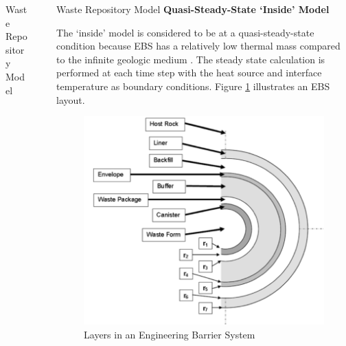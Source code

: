 \documentclass[final]{beamer}
\newlength{\sepwid}
\newlength{\onecolwid}
\newlength{\threecolwid}
\begin{document}
\begin{frame}[t]
\begin{columns}[t,totalwidth=\threecolwid]
\begin{column}{\onecolwid}
\begin{block}{Waste Repository Model}
\end{block}



\end{column} %

\begin{column}{\sepwid}\end{column} %

\begin{column}{\onecolwid} %

\begin{block}{Waste Repository Model}
\textbf{Quasi-Steady-State `Inside' Model}

The `inside' model is considered to be at a quasi-steady-state condition because \gls{EBS}
has a relatively low thermal mass compared to the infinite geologic medium 
\cite{sutton_investigations_2011}. 
The steady state calculation is performed at each time step with the heat source and 
interface temperature as boundary conditions. 
Figure \ref{fig:ebs_layers} illustrates an \gls{EBS} layout.

\begin{figure}
	\label{fig:ebs_layers}
	\includegraphics[width=0.9\linewidth]{ebs_layers}
	\caption{Layers in an Engineering Barrier System \cite{sutton_investigations_2011}}
\end{figure}

\end{block}



\end{column}
\end{columns}
\end{frame}
\end{document}
